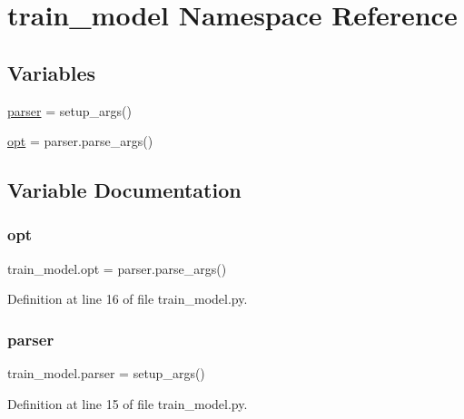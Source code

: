 \hypertarget{namespacetrain__model}{}\section{train\+\_\+model Namespace Reference}
\label{namespacetrain__model}
\subsection*{Variables}
\begin{DoxyCompactItemize}
\item 
\hyperlink{namespacetrain__model_ab036cc629f61c94d93f79d9071e25e62}{parser} = setup\+\_\+args()
\item 
\hyperlink{namespacetrain__model_a81a7509e6c032fb47a5d28990039557a}{opt} = parser.\+parse\+\_\+args()
\end{DoxyCompactItemize}


\subsection{Variable Documentation}
\mbox{\label{namespacetrain__model_a81a7509e6c032fb47a5d28990039557a}} 
\subsubsection{\texorpdfstring{opt}{opt}}
{\footnotesize\ttfamily train\+\_\+model.\+opt = parser.\+parse\+\_\+args()}



Definition at line 16 of file train\+\_\+model.\+py.

\mbox{\label{namespacetrain__model_ab036cc629f61c94d93f79d9071e25e62}} 
\subsubsection{\texorpdfstring{parser}{parser}}
{\footnotesize\ttfamily train\+\_\+model.\+parser = setup\+\_\+args()}



Definition at line 15 of file train\+\_\+model.\+py.

